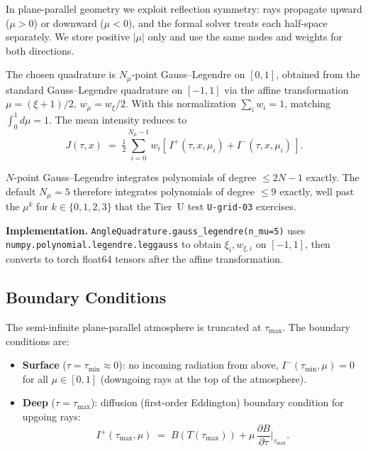 \documentclass[11pt]{article}
\newcommand{\half}{\tfrac{1}{2}}
\newcommand{\code}[1]{\texttt{#1}}
\begin{document}
In plane-parallel geometry we exploit reflection symmetry: rays
propagate upward ($\mu > 0$) or downward ($\mu < 0$), and the formal
solver treats each half-space separately.  We store positive $|\mu|$
only and use the same nodes and weights for both directions.

The chosen quadrature is $N_\mu$-point Gauss--Legendre on $[0, 1]$,
obtained from the standard Gauss--Legendre quadrature on $[-1, 1]$
via the affine transformation $\mu = (\xi + 1)/2$, $w_\mu = w_\xi / 2$.
With this normalization $\sum_i w_i = 1$, matching $\int_0^1 d\mu = 1$.
The mean intensity reduces to
\begin{equation}
J(\tau, x) \;=\; \half\!\sum_{i=0}^{N_\mu - 1} w_i\!\left[\,I^{+}(\tau, x, \mu_i) + I^{-}(\tau, x, \mu_i)\,\right].
\label{eq:J-discrete}
\end{equation}

$N$-point Gauss--Legendre integrates polynomials of degree $\leq 2N - 1$
exactly.  The default $N_\mu = 5$ therefore integrates polynomials of
degree $\leq 9$ exactly, well past the $\mu^k$ for $k \in \{0,1,2,3\}$
that the Tier~U test \texttt{U-grid-03} exercises.

\textbf{Implementation.} \code{AngleQuadrature.gauss\_legendre(n\_mu=5)} uses
\code{numpy.polynomial.legendre.leggauss} to obtain $\xi_i, w_{\xi,i}$ on
$[-1, 1]$, then converts to torch float64 tensors after the affine
transformation.

\subsection{Boundary Conditions}
\label{sec:bcs}

The semi-infinite plane-parallel atmosphere is truncated at $\tau_{\max}$.
The boundary conditions are:
\begin{itemize}
\item \textbf{Surface} ($\tau = \tau_{\min} \approx 0$): no incoming
radiation from above, $I^{-}(\tau_{\min}, \mu) = 0$ for all $\mu \in [0, 1]$
(downgoing rays at the top of the atmosphere).
\item \textbf{Deep} ($\tau = \tau_{\max}$): diffusion (first-order Eddington)
boundary condition for upgoing rays:
\begin{equation}
I^{+}(\tau_{\max}, \mu) \;=\; B(T(\tau_{\max})) + \mu\,\frac{\partial B}{\partial \tau}\bigg|_{\tau_{\max}} .
\label{eq:lower-bc}
\end{equation}
\end{itemize}
\end{document}
